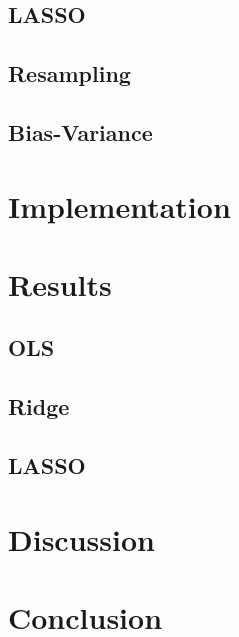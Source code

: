 \documentclass[%
reprint,
amsmath,amssymb,
aps,
]{revtex4-2}
\begin{document}
\subsection{LASSO}

\subsection{Resampling}

\subsection{Bias-Variance}

\section{Implementation}

\section{Results}

\subsection{OLS}

\subsection{Ridge}

\subsection{LASSO}

\section{Discussion}

\section{Conclusion}
\end{document}
